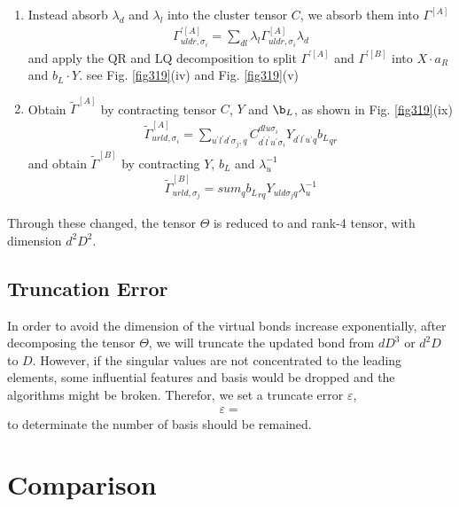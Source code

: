 \begin{enumerate}
	\item Instead absorb $\lambda_d$ and $\lambda_l$ into the cluster tensor $C$, we absorb them into $\Gamma^{[A]}$
		\begin{align}
			\Gamma^{\prime [A]}_{uldr,\sigma_i} = \sum_{dl}{\lambda_l \Gamma^{[A]}_{uldr,\sigma_i} \lambda_d}
		\end{align}
		and apply the QR and LQ decomposition to split $\Gamma^{\prime [A]}$ and $\Gamma^{\prime [B]}$ into $X\cdot a_R$ and $b_L \cdot Y$. see Fig. \ref{fig319}(iv) and Fig. \ref{fig319}(v) 
	\item Obtain $\widetilde{\Gamma}^{[A]}$ by contracting tensor $C$, $Y$ and $\b_L$, as shown in Fig. \ref{fig319}(ix)
		\begin{align}
			\widetilde{\Gamma}^{[A]}_{urld, \sigma_i} = \sum_{u^{\prime}l^{\prime}d^{\prime}\sigma_j,q}{C^{dlu\sigma_i}_{d^{\prime}l^{\prime}u^{\prime}\sigma_i}Y_{d^{\prime}l^{\prime}u^{\prime}q}{b_L}_{qr}}
		\end{align}
		and obtain $\widetilde{\Gamma}^{[B]}$ by contracting $Y$, $b_L$ and $\lambda_u^{-1}$
		\begin{align}
			\widetilde{\Gamma}^{[B]}_{urld,\sigma_j} = sum_{q}{{b_L}_{rq}Y_{uld\sigma_j q}\lambda_u^{-1}}
		\end{align}
\end{enumerate}

Through these changed, the tensor $\Theta$ is reduced to and rank-4 tensor, with dimension $d^2D^2$.

\subsection{Truncation Error}
In order to avoid the dimension of the virtual bonds increase exponentially, after decomposing the tensor $\Theta$, we will truncate the updated bond from $dD^3$ or $d^2D$ to $D$. However, if the singular values are not concentrated to the leading elements, some influential features and basis would be dropped and the algorithms might be broken. Therefor, we set a truncate error $\varepsilon$, 
\begin{align}
	\varepsilon = 
\end{align}
to determinate the number of basis should be remained.

\section{Comparison}

